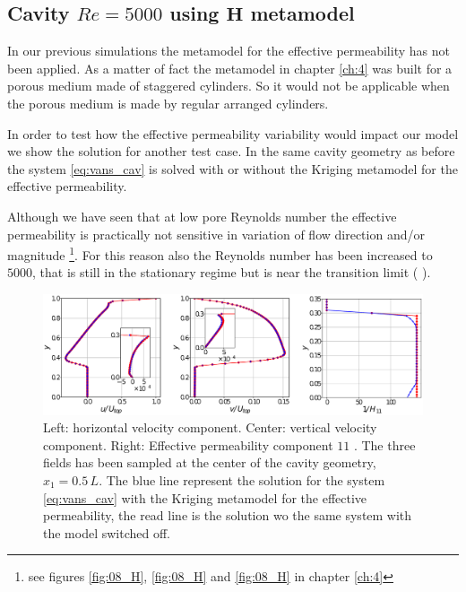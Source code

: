 \subsection{Cavity $Re=5000$ using $\mathbf{H}$ metamodel}
\label{pr:mata_cav}
In our previous simulations the metamodel for the effective permeability has not been applied.  As a matter of fact the metamodel in chapter \ref{ch:4} was built for a porous medium made of staggered cylinders. So it would not be applicable when the porous medium is made by regular arranged cylinders.

In order to test how the effective permeability variability would impact our model we show the solution for another test case. In the same cavity geometry as before the system \eqref{eq:vans_cav} is solved with or without the Kriging metamodel for the effective permeability.

Although we have seen that at low pore Reynolds number the effective permeability is practically not sensitive in variation of flow direction and/or magnitude \footnote{see figures \ref{fig:08_H}, \ref{fig:08_H} and \ref{fig:08_H} in chapter \ref{ch:4}}.
For this reason also the Reynolds number has been increased to $5000$, that is still in the stationary regime but is near the transition limit (\citet{peng2003transition} ).

\begin{figure}[h]
	\centering
	\includegraphics[width=0.9\linewidth]{chapter_5/figure/cav_5000}
	\caption{Left: horizontal velocity component. Center: vertical velocity component. Right: Effective permeability component $11$ . The three fields has been sampled at the center of the cavity geometry, $x_1=0.5 \,L$. The blue line represent the solution for the system \eqref{eq:vans_cav} with the Kriging metamodel for the effective permeability, the read line is the solution wo the same system with the model switched off.}
	\label{fig:cav5000}
\end{figure}

